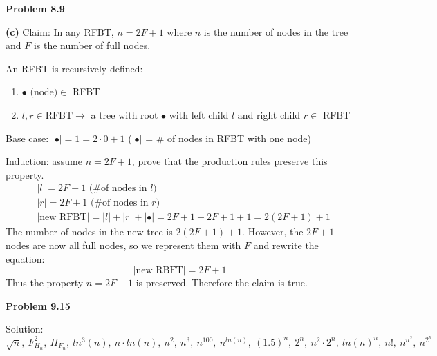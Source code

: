 \documentclass[fleqn]{article}
\begin{document}
\newpage
{\Large\bf Problem 8.9}\vspace{1em}\par
\textbf{(c)} Claim: In any RFBT, $n=2F+1$ where $n$ is the number of nodes in the tree and $F$ is the number of full nodes.\par
An RFBT is recursively defined:
\begin{enumerate}
	\item $\bullet \text{ (node)} \in$ RFBT \par
	\item $l,r \in \text{RFBT} \rightarrow$ a tree with root $\bullet$ with left child $l$ and right child $r \in$ RFBT
\end{enumerate}
Base case: $|\bullet| = 1 = 2 \cdot 0+1$ ($|\bullet|$ = \# of nodes in RFBT with one node)\par
Induction: assume $n=2F+1$, prove that the production rules preserve this property.
\begin{align*}
	&|l| = 2F+1 \text{ (\# of nodes in }l)\\
	&|r| = 2F+1 \text{ (\# of nodes in }r)\\
	&|\text{new RFBT}| = |l|+|r|+|\bullet| = 2F+1 + 2F+1 + 1 = 2(2F+1)+1
\end{align*}
The number of nodes in the new tree is $2(2F+1)+1$. However, the $2F+1$ nodes are now all full nodes, so we represent them with $F$ and rewrite the equation:
\begin{equation*}
	|\text{new RBFT}| = 2F+1
\end{equation*}
Thus the property $n=2F+1$ is preserved. Therefore the claim is true.

\newpage
{\Large\bf Problem 9.15}\vspace{1em}\par
Solution:
\begin{equation*}
	\sqrt{n},\ F^2_{H_n},\ H_{F_n},\ ln^3(n),\ n \cdot ln(n),\ n^2,\ n^3,\ n^{100},\ n^{ln(n)},\ (1.5)^n,\ 2^n,\ n^2 \cdot 2^n,\ ln(n)^n,\ n!,\ n^{n^2},\ n^{2^n}
\end{equation*}
\end{document}
